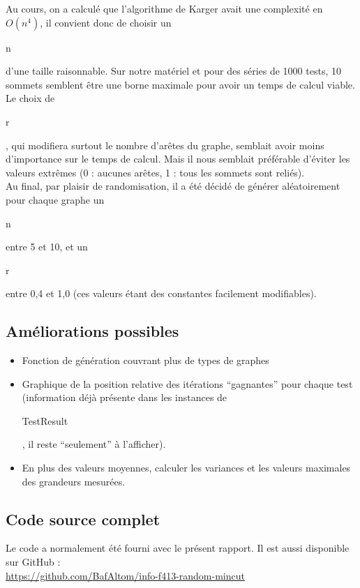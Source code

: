 \documentclass[a4paper,10pt]{article}
\begin{document}
Au cours, on a calculé que l'algorithme de Karger avait une complexité en \begin{math}O(n^{4})\end{math}, il convient donc de choisir un \begin{it}n\end{it} d'une taille raisonnable. Sur notre matériel et pour des séries de 1000 tests, 10 sommets semblent être une borne maximale pour avoir un temps de calcul viable.\\
Le choix de \begin{it}r\end{it}, qui modifiera surtout le nombre d'arêtes du graphe, semblait avoir moins d'importance sur le temps de calcul. Mais il nous semblait préférable d'éviter les valeurs extrêmes (0 : aucunes arêtes, 1 : tous les sommets sont reliés).\\
Au final, par plaisir de randomisation, il a été décidé de générer aléatoirement pour chaque graphe un \begin{it}n\end{it} entre 5 et 10, et un \begin{it}r\end{it} entre 0,4 et 1,0 (ces valeurs étant des constantes facilement modifiables).

\subsection{Améliorations possibles}

\begin{itemize}
 \item Fonction de génération couvrant plus de types de graphes
 \item Graphique de la position relative des itérations ``gagnantes'' pour chaque test (information déjà présente dans les instances de \begin{it}TestResult\end{it}, il reste ``seulement'' à l'afficher).
 \item En plus des valeurs moyennes, calculer les variances et les valeurs maximales des grandeurs mesurées.
\end{itemize}


\subsection{Code source complet}
Le code a normalement été fourni avec le présent rapport. Il est aussi disponible sur GitHub :\\
\url{https://github.com/BafAltom/info-f413-random-mincut}

\fontfamily{}
\end{document}
